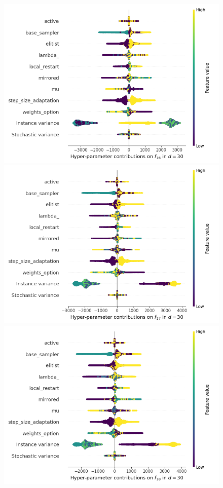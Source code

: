 \begin{figure}[t]
	\includegraphics[height=0.15\textheight,trim=60mm 0mm 0mm 0mm,clip]{cma_img_new/img_summary_f16_d30.png}
	\includegraphics[height=0.15\textheight,trim=0mm 0mm 30mm 0mm,clip]{cma_img_new/img_summary_f17_d30.png}
	\includegraphics[height=0.15\textheight,trim=60mm 0mm 30mm 0mm,clip]{cma_img_new/img_summary_f18_d30.png}

\end{figure}
